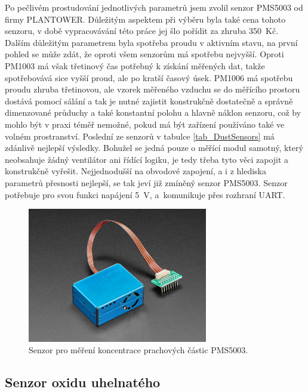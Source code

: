Po pečlivém prostudování jednotlivých parametrů jsem zvolil senzor PMS5003 od firmy PLANTOWER. Důležitým aspektem při výběru byla také cena tohoto senzoru, v době vypracovávání této práce jej šlo pořídit za zhruba 350~Kč. Dalším důležitým parametrem byla spotřeba proudu v aktivním stavu, na první pohled se může zdát, že oproti všem senzorům má spotřebu nejvyšší. Oproti PM1003 má však třetinový čas potřebný k získání měřených dat, takže spotřebovává sice vyšší proud, ale po kratší časový úsek. PM1006 má spotřebu proudu zhruba třetinovou, ale vzorek měřeného vzduchu se do měřícího prostoru dostává pomocí sálání a tak je nutné zajistit konstrukčně dostatečně a správně dimenzované průduchy a také konstantní polohu a hlavně náklon senzoru, což by mohlo být v praxi téměř nemožné, pokud má být zařízení používáno také ve volném prostranství. Poslední ze senzorů v tabulce \ref{tab_DustSensors} má zdánlivě nejlepší výsledky. Bohužel se jedná pouze o měřící modul samotný, který neobsahuje žádný ventilátor ani řídící logiku, je tedy třeba tyto věci zapojit a konstrukčně vyřešit. Nejjednodušší na obvodové zapojení, a i z hlediska parametrů přesnosti nejlepší, se tak jeví již zmíněný senzor PMS5003. Senzor potřebuje pro svou funkci napájení \SI{5}{\volt}, a~komunikuje přes rozhraní UART.

\begin{figure}
    \centering
    \includegraphics[width=0.7\textwidth]{obrazky/PMS5003.jpg}
    \caption{Senzor pro měření koncentrace prachových částic PMS5003. \cite{dat_PMS5003}}
    \label{fig_PMS5003}
\end{figure}

\subsection{Senzor oxidu uhelnatého}

